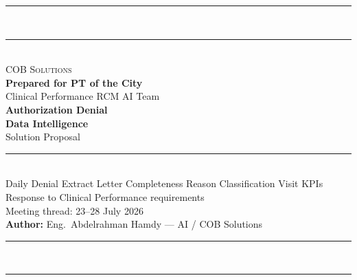 \documentclass[11pt,a4paper]{article}
\begin{document}

\begin{titlepage}
\pagecolor{PrimaryBlue}\color{white}
\vspace*{0.6cm}
\begin{center}
  \textcolor{AccentGold}{\rule{0.88\linewidth}{2pt}}\\[0.3em]
  \textcolor{AccentGold}{\rule{0.88\linewidth}{0.5pt}}\\[1.4cm]

  {\fontsize{14}{18}\selectfont\color{SoftBlue}\textsc{COB Solutions}}\\[0.4em]
  {\fontsize{12}{16}\selectfont\color{AccentGold}\textbf{Prepared for PT of the City}}\\[0.3em]
  {\fontsize{11}{14}\selectfont\color{SoftBlue}Clinical Performance \textbullet{} RCM \textbullet{} AI Team}\\[1.2cm]

  {\fontsize{26}{32}\selectfont\bfseries Authorization Denial}\\[0.15em]
  {\fontsize{26}{32}\selectfont\bfseries Data Intelligence}\\[0.5em]
  {\fontsize{16}{20}\selectfont\color{AccentGold}Solution Proposal}\\[0.8em]

  \textcolor{AccentGold}{\rule{0.5\linewidth}{0.8pt}}\\[0.6em]
  {\color{SoftBlue}\small
    Daily Denial Extract \textbullet{} Letter Completeness \textbullet{}
    Reason Classification \textbullet{} Visit KPIs}\\[1.6cm]

  {\color{SoftBlue}\normalsize
    Response to Clinical Performance requirements\\[0.3em]
    Meeting thread: 23--28 July 2026}\\[0.8cm]

  {\color{AccentGold}\textbf{Author:} Eng.\ Abdelrahman Hamdy --- AI / COB Solutions}

  \vfill
  \textcolor{AccentGold}{\rule{0.88\linewidth}{0.5pt}}\\[0.3em]
  \textcolor{AccentGold}{\rule{0.88\linewidth}{2pt}}
\end{center}
\end{titlepage}
\nopagecolor\color{black}

\newpage
\tableofcontents
\newpage
\end{document}
